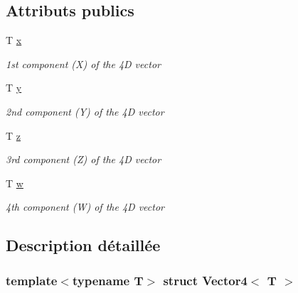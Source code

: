 \subsection*{Attributs publics}
\begin{DoxyCompactItemize}
\item 
\mbox{\label{structVector4_a2cedf20d2f695a4f0254681b13311ac9}} 
T \hyperlink{structVector4_a2cedf20d2f695a4f0254681b13311ac9}{x}
\begin{DoxyCompactList}\small\item\em 1st component (X) of the 4D vector \end{DoxyCompactList}\item 
\mbox{\label{structVector4_aad001ba27515dc2dcb921e9c83596520}} 
T \hyperlink{structVector4_aad001ba27515dc2dcb921e9c83596520}{y}
\begin{DoxyCompactList}\small\item\em 2nd component (Y) of the 4D vector \end{DoxyCompactList}\item 
\mbox{\label{structVector4_a5a7a1452d661e0b24e4b04c4dbff8ae7}} 
T \hyperlink{structVector4_a5a7a1452d661e0b24e4b04c4dbff8ae7}{z}
\begin{DoxyCompactList}\small\item\em 3rd component (Z) of the 4D vector \end{DoxyCompactList}\item 
\mbox{\label{structVector4_a83daff43fa2b88b4e76474f4b9a45276}} 
T \hyperlink{structVector4_a83daff43fa2b88b4e76474f4b9a45276}{w}
\begin{DoxyCompactList}\small\item\em 4th component (W) of the 4D vector \end{DoxyCompactList}\end{DoxyCompactItemize}


\subsection{Description détaillée}
\subsubsection*{template$<$typename T$>$\newline
struct Vector4$<$ T $>$}

